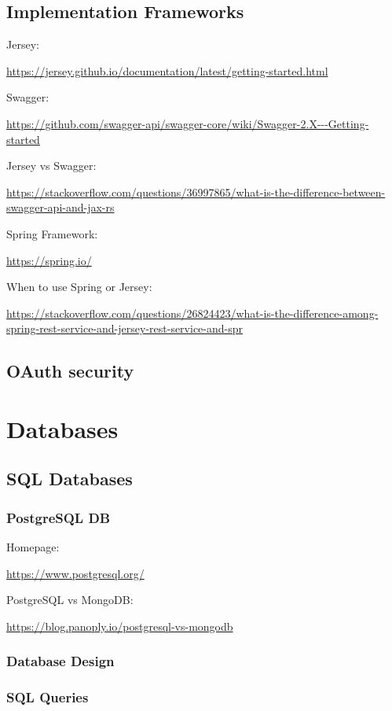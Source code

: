 \documentclass[12pt, numbers=noenddot]{scrreprt} %
\begin{document}
\section{Implementation Frameworks}

Jersey:

\url{https://jersey.github.io/documentation/latest/getting-started.html}

Swagger:

\url{https://github.com/swagger-api/swagger-core/wiki/Swagger-2.X---Getting-started}

Jersey vs Swagger:

\url{https://stackoverflow.com/questions/36997865/what-is-the-difference-between-swagger-api-and-jax-rs}

Spring Framework:

\url{https://spring.io/}

When to use Spring or Jersey:

\url{https://stackoverflow.com/questions/26824423/what-is-the-difference-among-spring-rest-service-and-jersey-rest-service-and-spr}

\section{OAuth security}

\chapter{Databases}

\section{SQL Databases}

\subsection{PostgreSQL DB}

Homepage:

\url{https://www.postgresql.org/}

PostgreSQL vs MongoDB:

\url{https://blog.panoply.io/postgresql-vs-mongodb}


\subsection{Database Design}
\subsection{SQL Queries}
\end{document}
